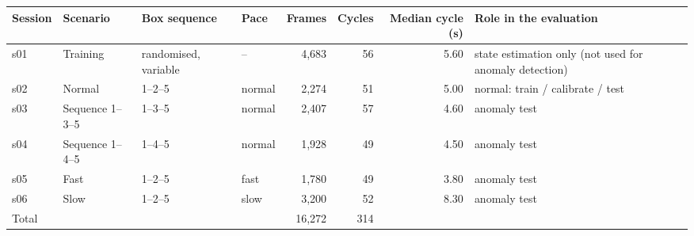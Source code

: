 \begin{tabular}{@{}llllrrrl@{}}
\toprule
Session & Scenario & Box sequence & Pace & Frames & Cycles & Median cycle (s) & Role in the evaluation \\
\midrule
s01 & Training & randomised{,} variable & -- & 4{,}683 & 56 & 5.60 & state estimation only (not used for anomaly detection) \\ %
s02 & Normal & 1--2--5 & normal & 2{,}274 & 51 & 5.00 & normal: train / calibrate / test \\ %
s03 & Sequence 1--3--5 & 1--3--5 & normal & 2{,}407 & 57 & 4.60 & anomaly test \\ %
s04 & Sequence 1--4--5 & 1--4--5 & normal & 1{,}928 & 49 & 4.50 & anomaly test \\ %
s05 & Fast & 1--2--5 & fast & 1{,}780 & 49 & 3.80 & anomaly test \\ %
s06 & Slow & 1--2--5 & slow & 3{,}200 & 52 & 8.30 & anomaly test \\ %
\midrule
Total & & & & 16{,}272 & 314 & & \\ %
\bottomrule
\end{tabular}
